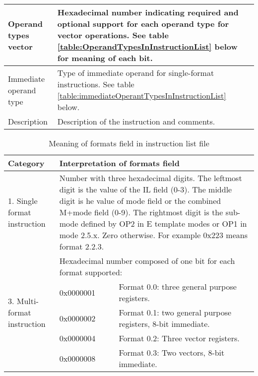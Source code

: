 \documentclass[forwardcom.tex]{subfiles}
\begin{document}
\begin{longtable} {|p{18mm}|p{100mm}|}
\hline
Operand types vector & Hexadecimal number indicating required and optional support for each operand type for vector operations. See table \ref{table:OperandTypesInInstructionList} below for meaning of each bit. \\
\hline
Immediate operand type & Type of immediate operand for single-format instructions. See table \ref{table:immediateOperantTypesInInstructionList} below. \\
\hline
Description & Description of the instruction and comments. \\
\hline
\end{longtable}

\pagebreak %
\label{table_format_field_in_list}
\begin{longtable} {|p{18mm}|p{20mm} p{80mm}|}
\caption{Meaning of formats field in instruction list file} 
\label{table:MeaningOfFormatsFieldInInstructionListFile}
\\
\endfirsthead
\endhead
\hline
\bfseries Category & \multicolumn{2}{|l|}{\bfseries Interpretation of formats field} \\
\hline
1.  Single format instruction & \multicolumn{2}{|p{102mm}|}{
Number with three hexadecimal digits. \newline
The leftmost digit is the value of the IL field (0-3). \newline
The middle digit is he value of mode field or the combined M+mode field (0-9).\newline
The rightmost digit is the sub-mode defined by OP2 in E template modes or OP1 in mode 2.5.x. Zero otherwise. \newline
For example 0x223 means format 2.2.3.
}  \\
\hline
\multirow{27}{*}{\parbox[t]{18mm}{3. Multi-format instruction}} 
  &  \multicolumn{2}{|l|}{
     Hexadecimal number composed of one bit for each format supported:} \\
  &  0x0000001 & Format 0.0: three general purpose registers. \\
  &  0x0000002 & Format 0.1: two general purpose registers, 8-bit immediate. \\
  &  0x0000004 & Format 0.2: Three vector registers. \\
  &  0x0000008 & Format 0.3: Two vectors, 8-bit immediate. \\

\end{longtable}
\end{document}
